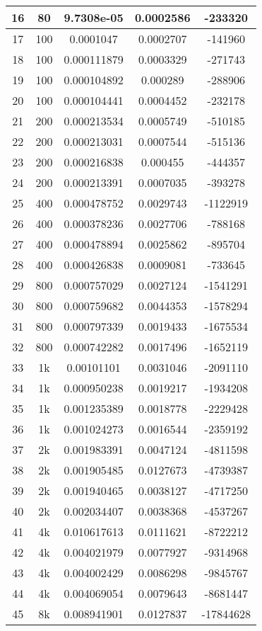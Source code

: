 \begin{center}
\begin{longtable}{|c|c|c|c|c|}
16 & 80 & 9.7308e-05 & 0.0002586 & -233320\\
\hline
17 & 100 & 0.0001047 & 0.0002707 & -141960\\
18 & 100 & 0.000111879 & 0.0003329 & -271743\\
19 & 100 & 0.000104892 & 0.000289 & -288906\\
20 & 100 & 0.000104441 & 0.0004452 & -232178\\
\hline
21 & 200 & 0.000213534 & 0.0005749 & -510185\\
22 & 200 & 0.000213031 & 0.0007544 & -515136\\
23 & 200 & 0.000216838 & 0.000455 & -444357\\
24 & 200 & 0.000213391 & 0.0007035 & -393278\\
\hline
25 & 400 & 0.000478752 & 0.0029743 & -1122919\\
26 & 400 & 0.000378236 & 0.0027706 & -788168\\
27 & 400 & 0.000478894 & 0.0025862 & -895704\\
28 & 400 & 0.000426838 & 0.0009081 & -733645\\
\hline
29 & 800 & 0.000757029 & 0.0027124 & -1541291\\
30 & 800 & 0.000759682 & 0.0044353 & -1578294\\
31 & 800 & 0.000797339 & 0.0019433 & -1675534\\
32 & 800 & 0.000742282 & 0.0017496 & -1652119\\
\hline
33 & 1k & 0.00101101 & 0.0031046 & -2091110\\
34 & 1k & 0.000950238 & 0.0019217 & -1934208\\
35 & 1k & 0.001235389 & 0.0018778 & -2229428\\
36 & 1k & 0.001024273 & 0.0016544 & -2359192\\
\hline
37 & 2k & 0.001983391 & 0.0047124 & -4811598\\
38 & 2k & 0.001905485 & 0.0127673 & -4739387\\
39 & 2k & 0.001940465 & 0.0038127 & -4717250\\
40 & 2k & 0.002034407 & 0.0038368 & -4537267\\
\hline
41 & 4k & 0.010617613 & 0.0111621 & -8722212\\
42 & 4k & 0.004021979 & 0.0077927 & -9314968\\
43 & 4k & 0.004002429 & 0.0086298 & -9845767\\
44 & 4k & 0.004069054 & 0.0079643 & -8681447\\
\hline
45 & 8k & 0.008941901 & 0.0127837 & -17844628\\

\end{longtable}
\end{center}
